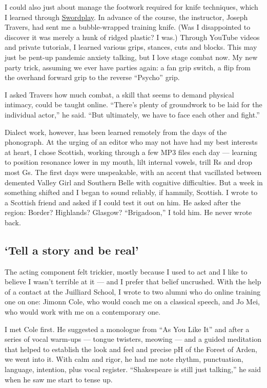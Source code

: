 I could also just about manage the footwork required for knife
techniques, which I learned through
\href{http://www.swordplaystagecombat.com/}{Swordplay}. In advance of
the course, the instructor, Joseph Travers, had sent me a bubble-wrapped
training knife. (Was I disappointed to discover it was merely a hunk of
ridged plastic? I was.) Through YouTube videos and private tutorials, I
learned various grips, stances, cuts and blocks. This may just be
pent-up pandemic anxiety talking, but I love stage combat now. My new
party trick, assuming we ever have parties again: a fan grip switch, a
flip from the overhand forward grip to the reverse ``Psycho'' grip.

I asked Travers how much combat, a skill that seems to demand physical
intimacy, could be taught online. ``There's plenty of groundwork to be
laid for the individual actor,'' he said. ``But ultimately, we have to
face each other and fight.''

Dialect work, however, has been learned remotely from the days of the
phonograph. At the urging of an editor who may not have had my best
interests at heart, I chose Scottish, working through a few MP3 files
each day --- learning to position resonance lower in my mouth, lilt
internal vowels, trill Rs and drop most Gs. The first days were
unspeakable, with an accent that vacillated between demented Valley Girl
and Southern Belle with cognitive difficulties. But a week in something
shifted and I began to sound reliably, if hammily, Scottish. I wrote to
a Scottish friend and asked if I could test it out on him. He asked
after the region: Border? Highlands? Glasgow? ``Brigadoon,'' I told him.
He never wrote back.

\hypertarget{tell-a-story-and-be-real}{%
\subsection{`Tell a story and be real'}\label{tell-a-story-and-be-real}}

The acting component felt trickier, mostly because I used to act and I
like to believe I wasn't terrible at it --- and I prefer that belief
uncrushed. With the help of a contact at the Juilliard School, I wrote
to two alumni who do online training one on one: Jimonn Cole, who would
coach me on a classical speech, and Jo Mei, who would work with me on a
contemporary one.

I met Cole first. He suggested a monologue from ``As You Like It'' and
after a series of vocal warm-ups --- tongue twisters, meowing --- and a
guided meditation that helped to establish the look and feel and precise
pH of the Forest of Arden, we went into it. With calm and rigor, he had
me note rhythm, punctuation, language, intention, plus vocal register.
``Shakespeare is still just talking,'' he said when he saw me start to
tense up.

